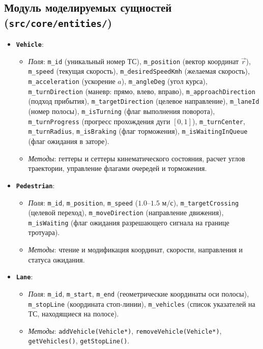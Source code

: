 \documentclass[11pt, a4paper]{article}
\begin{document}
\subsection{Модуль моделируемых сущностей (\texttt{src/core/entities/})}
\begin{itemize}
  \item \textbf{\texttt{Vehicle}}:
  \begin{itemize}
    \item \textit{Поля}: \texttt{m\_id} (уникальный номер ТС), \texttt{m\_position} (вектор координат $\vec{r}$), \texttt{m\_speed} (текущая скорость), \texttt{m\_desiredSpeedKmh} (желаемая скорость), \texttt{m\_acceleration} (ускорение $a$), \texttt{m\_angleDeg} (угол курса), \texttt{m\_turnDirection} (маневр: прямо, влево, вправо), \texttt{m\_approachDirection} (подход прибытия), \texttt{m\_targetDirection} (целевое направление), \texttt{m\_laneId} (номер полосы), \texttt{m\_isTurning} (флаг выполнения поворота), \texttt{m\_turnProgress} (прогресс прохождения дуги $[0, 1]$), \texttt{m\_turnCenter}, \texttt{m\_turnRadius}, \texttt{m\_isBraking} (флаг торможения), \texttt{m\_isWaitingInQueue} (флаг ожидания в заторе).
    \item \textit{Методы}: геттеры и сеттеры кинематического состояния, расчет углов траектории, управление флагами очередей и торможения.
  \end{itemize}
  \item \textbf{\texttt{Pedestrian}}:
  \begin{itemize}
    \item \textit{Поля}: \texttt{m\_id}, \texttt{m\_position}, \texttt{m\_speed} ($1.0$--$1.5\text{ м/с}$), \texttt{m\_targetCrossing} (целевой переход), \texttt{m\_moveDirection} (направление движения), \texttt{m\_isWaiting} (флаг ожидания разрешающего сигнала на границе тротуара).
    \item \textit{Методы}: чтение и модификация координат, скорости, направления и статуса ожидания.
  \end{itemize}
  \item \textbf{\texttt{Lane}}:
  \begin{itemize}
    \item \textit{Поля}: \texttt{m\_id}, \texttt{m\_start}, \texttt{m\_end} (геометрические координаты оси полосы), \texttt{m\_stopLine} (координата стоп-линии), \texttt{m\_vehicles} (список указателей на ТС, находящиеся на полосе).
    \item \textit{Методы}: \texttt{addVehicle(Vehicle*)}, \texttt{removeVehicle(Vehicle*)}, \texttt{getVehicles()}, \texttt{getStopLine()}.

\end{itemize}
\end{itemize}
\end{document}
